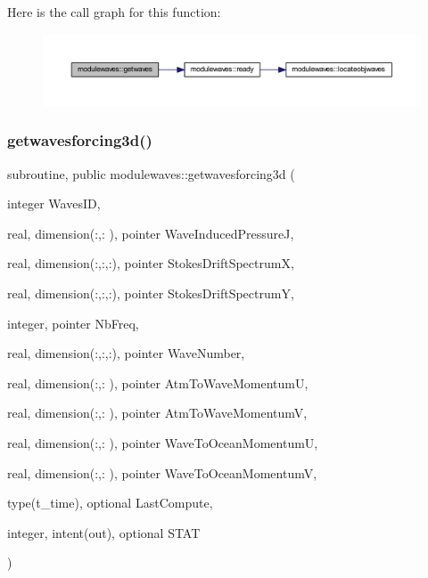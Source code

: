 Here is the call graph for this function\+:\nopagebreak
\begin{figure}[H]
\begin{center}
\leavevmode
\includegraphics[width=350pt]{namespacemodulewaves_a12875a6c82df32faa0d9a05dd2d67b1e_cgraph}
\end{center}
\end{figure}
\mbox{\label{namespacemodulewaves_a53569d674a6deea3e1da241680a758b3}} 
\subsubsection{\texorpdfstring{getwavesforcing3d()}{getwavesforcing3d()}}
{\footnotesize\ttfamily subroutine, public modulewaves\+::getwavesforcing3d (\begin{DoxyParamCaption}\item[{integer}]{Waves\+ID,  }\item[{real, dimension(\+:,\+:  ), pointer}]{Wave\+Induced\+PressureJ,  }\item[{real, dimension(\+:,\+:,\+:), pointer}]{Stokes\+Drift\+SpectrumX,  }\item[{real, dimension(\+:,\+:,\+:), pointer}]{Stokes\+Drift\+SpectrumY,  }\item[{integer, pointer}]{Nb\+Freq,  }\item[{real, dimension(\+:,\+:,\+:), pointer}]{Wave\+Number,  }\item[{real, dimension(\+:,\+:  ), pointer}]{Atm\+To\+Wave\+MomentumU,  }\item[{real, dimension(\+:,\+:  ), pointer}]{Atm\+To\+Wave\+MomentumV,  }\item[{real, dimension(\+:,\+:  ), pointer}]{Wave\+To\+Ocean\+MomentumU,  }\item[{real, dimension(\+:,\+:  ), pointer}]{Wave\+To\+Ocean\+MomentumV,  }\item[{type(t\+\_\+time), optional}]{Last\+Compute,  }\item[{integer, intent(out), optional}]{S\+T\+AT }\end{DoxyParamCaption})}

